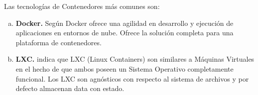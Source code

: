 Las tecnologías de Contenedores más comunes son:
\vspace{-1em}
\begin{enumerate}[a.]
  \item \textbf{Docker.}
    Según \cite{celesti2016exploring} Docker ofrece una agilidad en desarrollo y ejecución de aplicaciones
    en entornos de nube.
    Ofrece la solución completa para una plataforma de contenedores.
  \item \textbf{LXC.}
    \cite{celesti2016exploring} indica que LXC (Linux Containers) son  similares a Máquinas Virtuales
    en el hecho de que ambos poseen un Sistema Operativo completamente funcional.
    Los LXC son agnósticos con respecto al sistema de archivos y por defecto almacenan data con estado.
\end{enumerate}
\vspace{-1em}


%
%
%
%  
